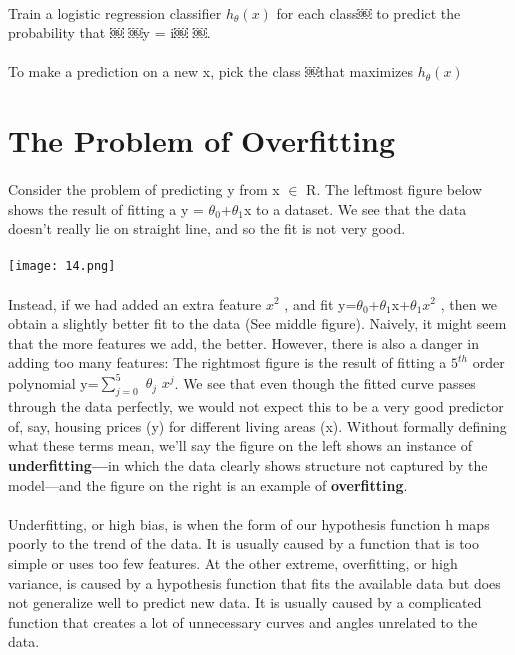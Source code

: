 \documentclass[UTF8]{ctexart}
\begin{document}
\paragraph{}
Train a logistic regression classifier $h_{\theta}(x)$ for each class￼ to predict the probability that ￼ ￼y = i￼ ￼.
\paragraph{}
To make a prediction on a new x, pick the class ￼that maximizes $h_{\theta}(x)$
\newpage
\section{The Problem of Overfitting}
\paragraph{}
Consider the problem of predicting y from x $\in$ R. The leftmost figure below shows the result of fitting a y = $\theta_{0}$+$\theta_{1}$x to a dataset. We see that the data doesn’t really lie on straight line, and so the fit is not very good.
\paragraph{}
\texttt{[image: 14.png]}
\paragraph{}
Instead, if we had added an extra feature $x^{2}$ , and fit y=$\theta_{0}$+$\theta_{1}$x+$\theta_{1}x^{2}$ , then we obtain a slightly better fit to the data (See middle figure). Naively, it might seem that the more features we add, the better. However, there is also a danger in adding too many features: The rightmost figure is the result of fitting a $5^{th}$ order polynomial y=$\sum_{j=0}^5$ $\theta_{j}$ $x^{j}$. We see that even though the fitted curve passes through the data perfectly, we would not expect this to be a very good predictor of, say, housing prices (y) for different living areas (x). Without formally defining what these terms mean, we’ll say the figure on the left shows an instance of \textbf{underfitting—}in which the data clearly shows structure not captured by the model—and the figure on the right is an example of \textbf{overfitting}.
\paragraph{}
Underfitting, or high bias, is when the form of our hypothesis function h maps poorly to the trend of the data. It is usually caused by a function that is too simple or uses too few features. At the other extreme, overfitting, or high variance, is caused by a hypothesis function that fits the available data but does not generalize well to predict new data. It is usually caused by a complicated function that creates a lot of unnecessary curves and angles unrelated to the data.
\end{document}
